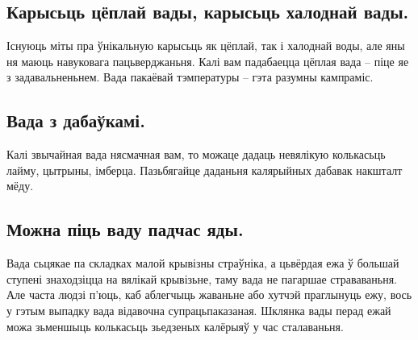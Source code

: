 \subsection{Карысьць цёплай вады, карысьць халоднай вады.}
Існуюць міты пра ўнікальную карысьць як цёплай, так і халоднай воды, але яны ня маюць навуковага пацьверджаньня. Калі вам падабаецца цёплая вада – піце яе з задавальненьнем. Вада пакаёвай тэмпературы – гэта разумны кампраміс.

\subsection{Вада з дабаўкамі.}
Калі звычайная вада нясмачная вам, то можаце дадаць невялікую колькасьць лайму, цытрыны, імберца. Пазьбягайце даданьня калярыйных дабавак накшталт мёду.

\subsection{Можна піць ваду падчас яды.}
Вада сьцякае па складках малой крывізны страўніка, а цьвёрдая ежа ў большай ступені знаходзіцца на вялікай крывізьне, таму вада не пагаршае страваваньня. Але часта людзі п'юць, каб аблегчыць жаваньне або хутчэй праглынуць ежу, вось у гэтым выпадку вада відавочна супрацьпаказаная. Шклянка вады перад ежай можа зьменшыць колькасьць зьедзеных калёрыяў у час сталаваньня.
